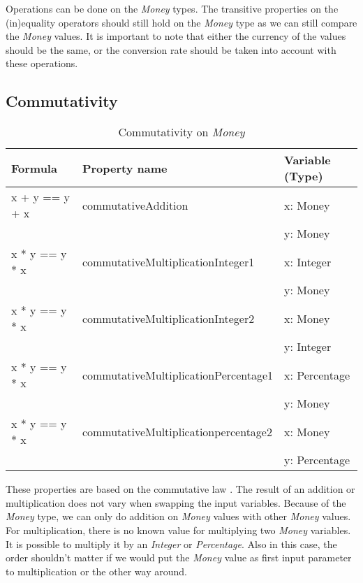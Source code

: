 Operations can be done on the \textit{Money} types. The transitive properties \cite{raftery2011perspective} on the (in)equality operators should still hold on the \textit{Money} type as we can still compare the \textit{Money} values. It is important to note that either the currency of the values should be the same, or the conversion rate should be taken into account with these operations.

\subsection*{Commutativity}
\label{ssct:4_commutativity}
\begin{table}[h!]
\centering
\begin{tabular}{|lll|}
\hline
                        \textbf{Formula} & \textbf{Property name}               & \textbf{Variable (Type)} \\ \hline
\rowcolor[HTML]{EFEFEF} x + y == y + x   & commutativeAddition                  & x: Money                 \\
\rowcolor[HTML]{EFEFEF}                  &                                      & y: Money                 \\
                        x * y == y * x   & commutativeMultiplicationInteger1    & x: Integer               \\
                                         &                                      & y: Money                 \\
\rowcolor[HTML]{EFEFEF} x * y == y * x   & commutativeMultiplicationInteger2    & x: Money                 \\
\rowcolor[HTML]{EFEFEF}                  &                                      & y: Integer               \\
                        x * y == y * x   & commutativeMultiplicationPercentage1 & x: Percentage            \\
                                         &                                      & y: Money                 \\
\rowcolor[HTML]{EFEFEF} x * y == y * x   & commutativeMultiplicationpercentage2 & x: Money                 \\
\rowcolor[HTML]{EFEFEF}                  &                                      & y: Percentage            \\ \hline
\end{tabular}
\caption{Commutativity on \textit{Money}}
\label{tbl:ch4_money_commutativity}
\end{table}
These properties are based on the commutative law \cite{baumgart1961axioms}. The result of an addition or multiplication does not vary when swapping the input variables. Because of the \textit{Money} type, we can only do addition on \textit{Money} values with other \textit{Money} values. For multiplication, there is no known value for multiplying two \textit{Money} variables. It is possible to multiply it by an \textit{Integer} or \textit{Percentage}. Also in this case, the order shouldn't matter if we would put the \textit{Money} value as first input parameter to multiplication or the other way around.

